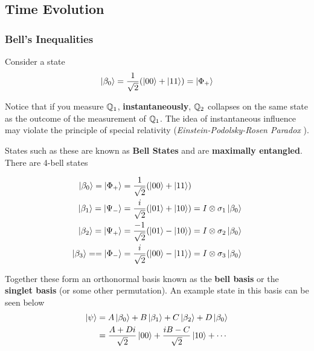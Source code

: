 \documentclass[reprint, amsmath,amssymb, aps]{revtex4-2}
\begin{document}
            \subsection{Time Evolution}
                
            \subsubsection{Bell's Inequalities}
                Consider a state
                \begin{equation*}
                    \ket{\beta_0} = \frac{1}{\sqrt{2}} (\ket{00}+\ket{11}) = \ket{\Phi_{+}}
                \end{equation*}

                Notice that if you measure $\mathbb{Q}_1$, \textbf{instantaneously}, $\mathbb{Q}_2$ collapses on the same state as the outcome of the measurement of $\mathbb{Q}_1$.  The idea of instantaneous influence may violate the principle of special relativity (\textit{Einstein-Podolsky-Rosen Paradox} \cite{epr}).

                States such as these are known as \textbf{Bell States} and are \textbf{maximally entangled}. There are 4-bell states

                \begin{align*}
                    \ket{\beta_0} = \ket{\Phi_{+}} &= \frac{1}{\sqrt{2}}(\ket{00} + \ket{11}) \\
                    \ket{\beta_1} = \ket{\Psi_{-}} &= \frac{i}{\sqrt{2}}(\ket{01} + \ket{10}) = I\otimes\sigma_1 \ket{\beta_0}\\
                    \ket{\beta_2}  = \ket{\Psi_{+}} &= \frac{-1}{\sqrt{2}}(\ket{01} - \ket{10}) = I\otimes\sigma_2 \ket{\beta_0} \\
                    \ket{\beta_3} =  = \ket{\Phi_{-}} &= \frac{i}{\sqrt{2}}(\ket{00} - \ket{11}) = I\otimes\sigma_3 \ket{\beta_0}
                \end{align*}

                Together these form an orthonormal basis known as the \textbf{bell basis} or the \textbf{singlet basis} (or some other permutation). An example state in this basis can be seen below
                \begin{align*}
                \ket{\psi} &= A\ket{\beta_0} + B \ket{\beta_1} + C\ket{\beta_2} + D\ket{\beta_0}
                 \\
                &= \frac{A+Di}{\sqrt{2}}\ket{00} + \frac{iB - C}{\sqrt{2}}\ket{10} + \cdots
                \end{align*}
\end{document}
